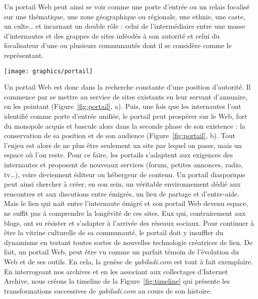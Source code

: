 \documentclass[symmetric,justified,marginals=raggedouter]{tufte-book}
\begin{document}
\noindent Un portail Web peut ainsi se voir comme une porte d'entrée ou un relais focalisé sur une thématique, une zone géographique ou régionale, une ethnie, une caste, un culte\ldots{} et incarnant un double rôle : celui de l'intermédiaire entre une masse d'internautes et des grappes de sites inféodés à son autorité et celui du focalisateur d'une ou plusieurs communautés dont il se considère comme le représentant. 

\newpage 

\begin{figure*}
  \texttt{[image: graphics/portail]}
  \caption{Dynamique de création d'un portail Web autour d'une communauté de sites}
  \label{fig:portail}
\end{figure*}

\noindent Un portail Web est donc dans la recherche constante d'une position d'autorité. Il commence par se mettre au service de sites existants en leur servant d'annuaire, en les pointant (Figure~\ref{fig:portail}, a). Puis, une fois que les internautes l'ont identifié comme porte d'entrée unifiée, le portail peut prospérer sur le Web, fort du monopole acquis et bascule alors dans la seconde phase de son existence : la conservation de sa position et de son audience (Figure~\ref{fig:portail}, b). Tout l'enjeu est alors de ne plus être seulement un site par lequel on passe, mais un espace où l'on reste. Pour ce faire, les portails s'adaptent aux exigences des internautes et proposent de nouveaux services (forum, petites annonces, radio, tv\ldots{}), voire deviennent éditeur ou hébergeur de contenu. Un portail diasporique peut ainsi chercher à créer, en son sein, un véritable environnement dédié aux rencontres et aux discutions entre émigrés, un lieu de partage et d'entre-aide. \\


\noindent Mais le lien qui nait entre l'internaute émigré et son portail Web devenu espace, ne suffit pas à comprendre la longévité de ces sites. Eux qui, contrairement aux blogs, ont su résister et s'adapter à l'arrivée des réseaux sociaux. Pour continuer à être la vitrine culturelle de sa communauté, le portail doit y insuffler du dynamisme en testant toutes sortes de nouvelles technologie créatrices de lien. De fait, un portail Web, peut être vu comme un parfait témoin de l'évolution du Web et de ses outils. En cela, la genèse de \textit{yabiladi.com} est tout à fait exemplaire. En interrogeant nos archives et en les associant aux collectages d'Internet Archive, nous créons la timeline de la Figure~\ref{fig:timeline} qui présente les transformations successives de \textit{yabiladi.com} au cours de son histoire.
\end{document}
